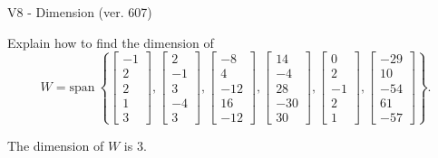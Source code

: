 \begin{exercise}
  \begin{exerciseTitle}V8 - Dimension (ver. 607)\end{exerciseTitle}
  \begin{exerciseStatement}
    Explain how to find the dimension of 
\[W=\mathrm{span}\ \left\{\left[\begin{array}{r}
-1 \\
2 \\
2 \\
1 \\
3
\end{array}\right] , \left[\begin{array}{r}
2 \\
-1 \\
3 \\
-4 \\
3
\end{array}\right] , \left[\begin{array}{r}
-8 \\
4 \\
-12 \\
16 \\
-12
\end{array}\right] , \left[\begin{array}{r}
14 \\
-4 \\
28 \\
-30 \\
30
\end{array}\right] , \left[\begin{array}{r}
0 \\
2 \\
-1 \\
2 \\
1
\end{array}\right] , \left[\begin{array}{r}
-29 \\
10 \\
-54 \\
61 \\
-57
\end{array}\right]\right\}.\]



  \end{exerciseStatement}
  \begin{exerciseAnswer}
   The dimension of \(W\) is  \(3\).
  


  \end{exerciseAnswer}
\end{exercise}